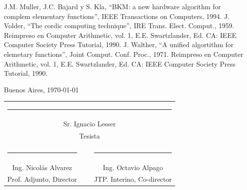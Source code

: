 \documentclass[a4paper]{article}
\newcommand{\signature}[7]{
   \vfill

   \begin{flushright}
      #1, \today
   \end{flushright}
   \vspace{3cm}

   \noindent
   \centering
   \begin{tabularx}{0.9\textwidth}{cXc}
      \multicolumn{3}{c}{\rule{5cm}{1pt}}\\
      \multicolumn{3}{c}{#2}\\
      \multicolumn{3}{c}{#3}\\
      \vspace{3cm}\\
      \rule{5cm}{1pt} & \hspace{2.5cm} & \rule{5cm}{1pt} \\
      #4 & ~ & #5 \\
      #6 & ~ & #7
   \end{tabularx}
   \vspace{1cm}
}
\begin{document}
\begin{thebibliography}{99}

 J.M. Muller, J.C. Bajard y S. Kla, ``BKM: a new hardware algorithm for complem elementary functions'', IEEE Transactions on Computers, 1994.
 J. Volder, ``The cordic computing technique'', IRE Trans. Elect. Comput., 1959. Reimpreso en Computer Arithmetic, vol. 1, E.E. Swartzlander, Ed. CA: IEEE Computer Society Press Tutorial, 1990.
 J. Walther, ``A unified algortithm for elemetary functions'', Joint Comput. Conf. Proc., 1971. Reimpreso en Computer Arithmetic, vol. 1, E.E. Swartzlander, Ed. CA: IEEE Computer Society Press Tutorial, 1990.
\end{thebibliography}

\newpage

\signature{Buenos Aires}{Sr. Ignacio Lesser}{Tesista}{Ing. Nicolás Alvarez}{Ing. Octavio Alpago}{Prof. Adjunto, Director}{JTP. Interino, Co-director}
\end{document}
